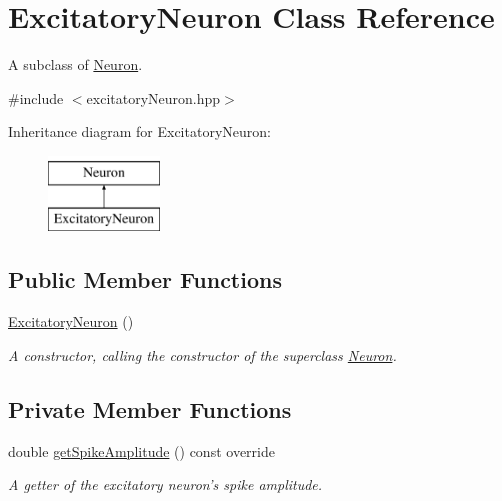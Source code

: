 \hypertarget{classExcitatoryNeuron}{\section{Excitatory\-Neuron Class Reference}
\label{classExcitatoryNeuron}
}


A subclass of \hyperlink{classNeuron}{Neuron}.  




{\ttfamily \#include $<$excitatory\-Neuron.\-hpp$>$}

Inheritance diagram for Excitatory\-Neuron\-:\begin{figure}[H]
\begin{center}
\leavevmode
\includegraphics[height=2.000000cm]{classExcitatoryNeuron}
\end{center}
\end{figure}
\subsection*{Public Member Functions}
\begin{DoxyCompactItemize}
\item 
\hypertarget{classExcitatoryNeuron_a6671b58ccab729f837478530e3cdf922}{\hyperlink{classExcitatoryNeuron_a6671b58ccab729f837478530e3cdf922}{Excitatory\-Neuron} ()}\label{classExcitatoryNeuron_a6671b58ccab729f837478530e3cdf922}

\begin{DoxyCompactList}\small\item\em A constructor, calling the constructor of the superclass \hyperlink{classNeuron}{Neuron}. \end{DoxyCompactList}\end{DoxyCompactItemize}
\subsection*{Private Member Functions}
\begin{DoxyCompactItemize}
\item 
double \hyperlink{classExcitatoryNeuron_ab0ee5f76af48d48de6c42b1f5b27142a}{get\-Spike\-Amplitude} () const override
\begin{DoxyCompactList}\small\item\em A getter of the excitatory neuron's spike amplitude. \end{DoxyCompactList}\end{DoxyCompactItemize}
